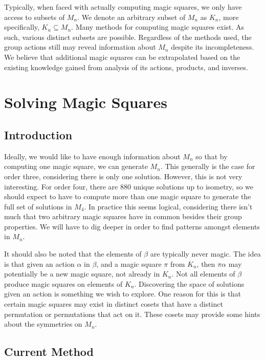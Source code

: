 \documentclass[12pt]{report}
\begin{document}
\par Typically, when faced with actually computing magic squares, we only have access to subsets
of $M_n$. We denote an arbitrary subset of $M_n$ as $K_n$, more specifically, $K_n \subseteq M_n$.
Many methods for computing magic squares exist. As such, various distinct subsets are possible.
Regardless of the methods used, the group actions still may reveal information about $M_n$ despite
its incompleteness. We believe that additional magic squares can be extrapolated based on the
existing knowledge gained from analysis of its actions, products, and inverses.

\chapter{Solving Magic Squares}

\section{Introduction}

\par Ideally, we would like to have enough information about $M_n$ so that by computing one magic
square, we can generate $M_n$. This generally is the case for order three, considering there is
only one solution. However, this is not very interesting. For order four, there are 880 unique
solutions up to isometry, so we should expect to have to compute more than one magic square to generate the full
set of solutions in $M_4$. In practice this seems logical, considering there isn't much that two
arbitrary magic squares have in common besides their group properties. We will have to dig deeper
in order to find patterns amongst elements in $M_n$.

\par It should also be noted that the elements of $\beta$ are typically never magic. The idea is that
given an action $\alpha$ in $\beta$, and a magic square $\pi$ from $K_n$, then $\pi\alpha$ may
potentially be a new magic square, not already in $K_n$. Not all elements of $\beta$ produce magic
squares on elements of $K_n$. Discovering the space of solutions given an action is something we
wish to explore. One reason for this is that certain magic squares may exist in distinct cosets
that have a distinct permutation or permutations that act on it. These cosets may provide some
hints about the symmetries on $M_n$.

\section{Current Method}
\end{document}
